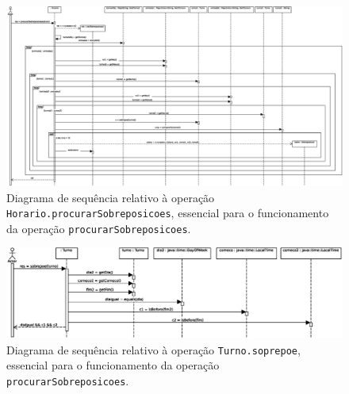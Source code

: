 \documentclass[12pt, a4paper]{article}
\begin{document}
\begin{landscape}
        \vspace*{\fill}
        \pagebreak
        \vspace*{\fill}

        \begin{figure}[H]
            \centering
            \includegraphics[scale=0.55]{Imagens/Modelos/procurarSobreposicoesHorarioDAO.svg.eps}
            \caption{
                Diagrama de sequência relativo à operação \texttt{Horario.procurarSobreposicoes},
                essencial para o funcionamento da operação \texttt{procurarSobreposicoes}.
            }
        \end{figure}

        \vspace*{\fill}
        \pagebreak
        \vspace*{\fill}

        \begin{figure}[H]
            \centering
            \includegraphics[scale=0.95]{Imagens/Modelos/procurarSobreposicoesTurnoDAO.svg.eps}
            \caption{
                Diagrama de sequência relativo à operação \texttt{Turno.soprepoe}, essencial para o
                funcionamento da operação \texttt{procurarSobreposicoes}.
            }
        \end{figure}

        \vspace*{\fill}
        \pagebreak
        \vspace*{\fill}


\end{landscape}
\end{document}

